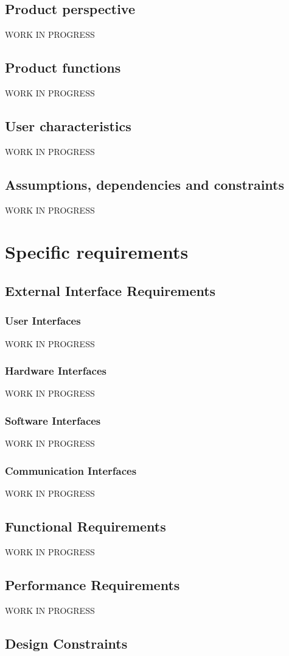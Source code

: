 \documentclass{report}
\begin{document}
		\section{Product perspective}
		WORK IN PROGRESS
		\section{Product functions}
		WORK IN PROGRESS
		\section{User characteristics}
		WORK IN PROGRESS
		\section{Assumptions, dependencies and constraints}
		WORK IN PROGRESS
	\chapter{Specific requirements}
		\section{External Interface Requirements}
			\subsection{User Interfaces}
			WORK IN PROGRESS
			\subsection{Hardware Interfaces}
			WORK IN PROGRESS
			\subsection{Software Interfaces}
			WORK IN PROGRESS
			\subsection{Communication Interfaces}
			WORK IN PROGRESS
		\section{Functional Requirements}
		WORK IN PROGRESS
		\section{Performance Requirements}
		WORK IN PROGRESS
		\section{Design Constraints}
\end{document}
